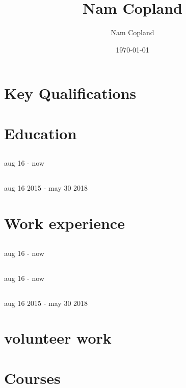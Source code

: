 \documentclass{crudecv/crudecv}
\title{Nam Copland}
\author{Nam Copland}
\date{\today}
\begin{document}
\maketitle

\section{Key Qualifications}

\section{Education}
\subsection{\lipsum[2][1]}
\lipsum[2][2] aug 16 - now

\subsection{\lipsum[2][3]}
\lipsum[2][4] aug 16 2015 - may 30 2018

\section{Work experience}
\subsection{\lipsum[3][1]}
\lipsum[3][2] aug 16 - now

\subsection{\lipsum[3][3]}
\lipsum[3][4] aug 16 - now

\subsection{\lipsum[3][5]}
\lipsum[3][6] aug 16 2015 - may 30 2018

\section{volunteer work}

\section{Courses}
\end{document}
